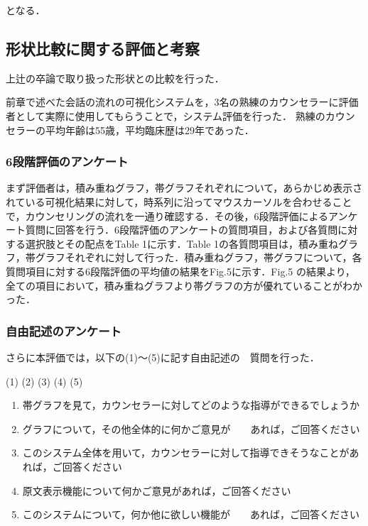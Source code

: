 \documentclass[shuuron]{kuee}
\begin{document}
となる．






\subsection{形状比較に関する評価と考察}
上辻の卒論で取り扱った形状との比較を行った．

前章で述べた会話の流れの可視化システムを，3名の熟練のカウンセラーに評価者として実際に使用してもらうことで，システム評価を行った．
熟練のカウンセラーの平均年齢は55歳，平均臨床歴は29年であった．

\subsubsection{6段階評価のアンケート}



まず評価者は，積み重ねグラフ，帯グラフそれぞれについて，あらかじめ表示されている可視化結果に対して，時系列に沿ってマウスカーソルを合わせることで，カウンセリングの流れを一通り確認する．その後，6段階評価によるアンケート質問に回答を行う．6段階評価のアンケートの質問項目，および各質問に対する選択肢とその配点をTable 1に示す．Table 1の各質問項目は，積み重ねグラフ，帯グラフそれぞれに対して行った．積み重ねグラフ，帯グラフについて，各質問項目に対する6段階評価の平均値の結果をFig.5に示す．Fig.5 の結果より，全ての項目において，積み重ねグラフより帯グラフの方が優れていることがわかった．


\subsubsection{自由記述のアンケート}

さらに本評価では，以下の(1)～(5)に記す自由記述の　質問を行った．

(1)
(2)
(3)
(4)
(5)

\begin{enumerate}
\item 帯グラフを見て，カウンセラーに対してどのような指導ができるでしょうか
\item グラフについて，その他全体的に何かご意見が　　あれば，ご回答ください
\item このシステム全体を用いて，カウンセラーに対して指導できそうなことがあれば，ご回答ください
\item 原文表示機能について何かご意見があれば，ご回答ください
\item このシステムについて，何か他に欲しい機能が　　あれば，ご回答ください
 \end{enumerate}
\end{document}
